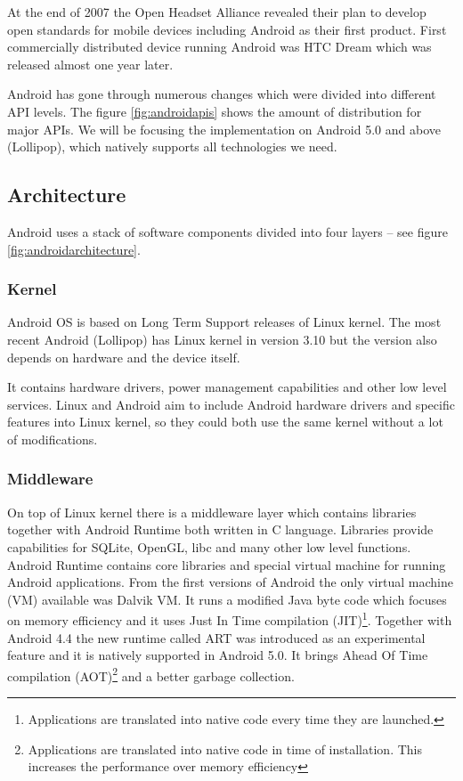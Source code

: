 At the end of 2007 the Open Headset Alliance revealed their plan to develop open standards for mobile devices including Android as their first product. First commercially distributed device running Android was HTC Dream which was released almost one year later.

Android has gone through numerous changes which were divided into different API levels. The figure \ref{fig:androidapis} shows the amount of distribution for major APIs. We will be focusing the implementation on Android 5.0 and above (Lollipop), which natively supports all technologies we need.


\subsection{Architecture}
Android uses a stack of software components divided into four layers -- see figure \ref{fig:androidarchitecture}.



\subsubsection{Kernel}
Android OS is based on Long Term Support releases of Linux kernel. The most recent Android (Lollipop) has Linux kernel in version 3.10 but the version also depends on hardware and the device itself.

It contains hardware drivers, power management capabilities and other low level services. Linux and Android aim to include Android hardware drivers and specific features into Linux kernel, so they could both use the same kernel without a lot of modifications.

\subsubsection{Middleware}
On top of Linux kernel there is a middleware layer which contains libraries together with Android Runtime both written in C language. Libraries provide capabilities for SQLite, OpenGL, libc and many other low level functions. Android Runtime contains core libraries and special virtual machine for running Android applications. From the first versions of Android the only virtual machine (VM) available was Dalvik VM. It runs a modified Java byte code which focuses on memory efficiency and it uses Just In Time compilation (JIT)\footnote{Applications are translated into native code every time they are launched.}. Together with Android 4.4 the new runtime called ART was introduced as an experimental feature and it is natively supported in Android 5.0. It brings Ahead Of Time compilation (AOT)\footnote{Applications are translated into native code in time of installation. This increases the performance over memory efficiency} and a better garbage collection.

